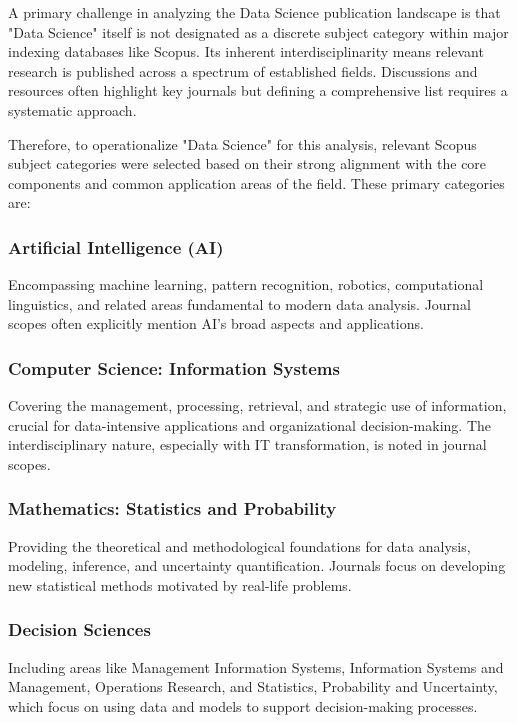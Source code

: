 \documentclass[../main.tex]{subfiles}
\begin{document}
\vspace{0.4cm}
\noindent
A primary challenge in analyzing the Data Science publication landscape is that "Data Science" itself is not designated as a discrete subject category within major indexing databases like Scopus. Its inherent interdisciplinarity means relevant research is published across a spectrum of established fields. Discussions and resources often highlight key journals but defining a comprehensive list requires a systematic approach. 
    
\vspace{0.4cm}
\noindent
Therefore, to operationalize "Data Science" for this analysis, relevant Scopus subject categories were selected based on their strong alignment with the core components and common application areas of the field. These primary categories are:
    
\subsubsection{Artificial Intelligence (AI)}
\vspace{0.2cm}
\noindent
Encompassing machine learning, pattern recognition, robotics, computational linguistics, and related areas fundamental to modern data analysis. Journal scopes often explicitly mention AI's broad aspects and applications.

\subsubsection{Computer Science: Information Systems}
\vspace{0.2cm}
\noindent    
Covering the management, processing, retrieval, and strategic use of information, crucial for data-intensive applications and organizational decision-making. The interdisciplinary nature, especially with IT transformation, is noted in journal scopes.

\subsubsection{Mathematics: Statistics and Probability} 
\vspace{0.2cm}
\noindent
Providing the theoretical and methodological foundations for data analysis, modeling, inference, and uncertainty quantification. Journals focus on developing new statistical methods motivated by real-life problems.

\subsubsection{Decision Sciences}
\vspace{0.2cm}
\noindent
Including areas like Management Information Systems, Information Systems and Management, Operations Research, and Statistics, Probability and Uncertainty, which focus on using data and models to support decision-making processes.
\end{document}
